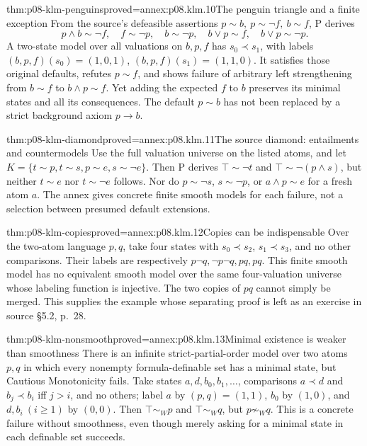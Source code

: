 \begin{hbtheorem}{thm:p08-klm-penguins}{proved=annex:p08.klm.10}{The penguin triangle and a finite exception}
From the source's defeasible assertions
\(p\sim b,\ p\sim\neg f,\ b\sim f\), P derives
\[
 p\wedge b\sim\neg f,\quad f\sim\neg p,\quad b\sim\neg p,
 \quad b\vee p\sim f,\quad b\vee p\sim\neg p.
\]
A two-state model over all valuations on \(b,p,f\) has
\(s_0\prec s_1\), with labels
\((b,p,f)(s_0)=(1,0,1)\),
\((b,p,f)(s_1)=(1,1,0)\).
It satisfies those original defaults, refutes \(p\sim f\), and
shows failure of arbitrary left strengthening from \(b\sim f\)
to \(b\wedge p\sim f\). Yet adding the expected \(f\) to \(b\)
preserves its minimal states and all its consequences.
The default \(p\sim b\) has not been replaced by a strict
background axiom \(p\to b\).
\end{hbtheorem}

\begin{hbtheorem}{thm:p08-klm-diamond}{proved=annex:p08.klm.11}{The source diamond: entailments and countermodels}
Use the full valuation universe on the listed atoms, and let
\(K=\{t\sim p,t\sim s,p\sim e,s\sim\neg e\}\).
Then P derives \(\top\sim\neg t\) and
\(\top\sim\neg(p\wedge s)\), but neither \(t\sim e\) nor
\(t\sim\neg e\) follows. Nor do \(p\sim\neg s\),
\(s\sim\neg p\), or \(a\wedge p\sim e\) for a fresh atom \(a\).
The annex gives concrete finite smooth models for each failure, not
a selection between presumed default extensions.
\end{hbtheorem}

\begin{hbtheorem}{thm:p08-klm-copies}{proved=annex:p08.klm.12}{Copies can be indispensable}
Over the two-atom language \(p,q\), take four states with
\(s_0\prec s_2\), \(s_1\prec s_3\), and no other comparisons.
Their labels are respectively \(p\neg q,\neg p\neg q,pq,pq\).
This finite smooth model has no equivalent smooth model over the same
four-valuation universe whose labeling function is injective. The two
copies of \(pq\) cannot simply be merged. This supplies the example
whose separating proof is left as an exercise in source \S5.2, p.~28.
\end{hbtheorem}

\begin{hbtheorem}{thm:p08-klm-nonsmooth}{proved=annex:p08.klm.13}{Minimal existence is weaker than smoothness}
There is an infinite strict-partial-order model over two atoms \(p,q\)
in which every nonempty formula-definable set has a minimal state,
but Cautious Monotonicity fails.
Take states \(a,d,b_0,b_1,\ldots\), comparisons
\(a\prec d\) and \(b_j\prec b_i\) iff \(j>i\), and no others;
label \(a\) by \((p,q)=(1,1)\), \(b_0\) by \((1,0)\), and
\(d,b_i\ (i\geq1)\) by \((0,0)\).
Then \(\top\sim_W p\) and \(\top\sim_W q\), but
\(p\not\sim_W q\). This is a concrete failure without smoothness,
even though merely asking for a minimal state in each definable set succeeds.
\end{hbtheorem}

